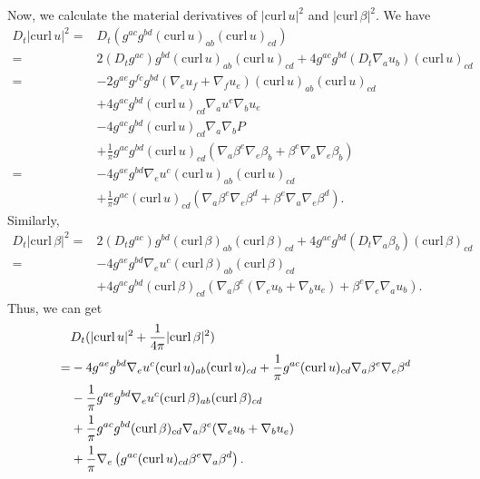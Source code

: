 \documentclass[12pt,reqno]{amsart}
\numberwithin{equation}{section}
\theoremstyle{definition}
\theoremstyle{remark}
\begin{document}
Now, we calculate the material derivatives of $|{\mathrm{curl}\,} u|^2$ and $|{\mathrm{curl}\,} \beta|^2$. We have
\begin{align*}
    D_t|{\mathrm{curl}\,} u|^2=&D_t\left(g^{ac}g^{bd}({\mathrm{curl}\,} u)_{ab}({\mathrm{curl}\,} u)_{cd}\right)\\
    =&2(D_t g^{ac})g^{bd}({\mathrm{curl}\,} u)_{ab}({\mathrm{curl}\,} u)_{cd}+4 g^{ac}g^{bd}(D_t{\nabla}_a u_b)({\mathrm{curl}\,} u)_{cd}\\
    =&-2g^{ae}g^{fc}g^{bd}({\nabla}_eu_f+{\nabla}_f u_e)({\mathrm{curl}\,} u)_{ab}({\mathrm{curl}\,} u)_{cd}\\
    &+4 g^{ac}g^{bd}({\mathrm{curl}\,} u)_{cd}{\nabla}_a u^e{\nabla}_bu_e\\
    &-4 g^{ac}g^{bd}({\mathrm{curl}\,} u)_{cd} {\nabla}_a{\nabla}_b{P } \\
    &+\frac{1}{\pi}g^{ac}g^{bd}({\mathrm{curl}\,} u)_{cd}({\nabla}_a\beta^e {\nabla}_e\beta_b+\beta^e{\nabla}_a{\nabla}_e\beta_b)\\
    =&-4g^{ae}g^{bd}{\nabla}_eu^c({\mathrm{curl}\,} u)_{ab}({\mathrm{curl}\,} u)_{cd}\\
    &+\frac{1}{\pi}g^{ac}({\mathrm{curl}\,} u)_{cd}({\nabla}_a\beta^e {\nabla}_e\beta^d+\beta^e{\nabla}_a{\nabla}_e\beta^d).
\end{align*}
Similarly,
\begin{align*}
    D_t|{\mathrm{curl}\,} \beta|^2=&2(D_t g^{ac})g^{bd}({\mathrm{curl}\,} \beta)_{ab}({\mathrm{curl}\,} \beta)_{cd}+4 g^{ac}g^{bd}(D_t{\nabla}_a \beta_b)({\mathrm{curl}\,} \beta)_{cd}\\
    =&-4g^{ae}g^{bd}{\nabla}_eu^c({\mathrm{curl}\,} \beta)_{ab}({\mathrm{curl}\,} \beta)_{cd}\\
    &+4 g^{ac}g^{bd}({\mathrm{curl}\,} \beta)_{cd}({\nabla}_a\beta^e({\nabla}_e u_b+{\nabla}_b u_e)+\beta^e{\nabla}_e{\nabla}_a u_b).
\end{align*}
Thus, we can get
\begin{align}\label{eq.1energy1.curl}
  &D_t(|{\mathrm{curl}\,} u|^2+\frac{1}{4\pi}|{\mathrm{curl}\,} \beta|^2){\nonumber}\\
  =&-4g^{ae}g^{bd}{\nabla}_eu^c({\mathrm{curl}\,} u)_{ab}({\mathrm{curl}\,} u)_{cd}+\frac{1}{\pi}g^{ac}({\mathrm{curl}\,} u)_{cd}{\nabla}_a\beta^e {\nabla}_e\beta^d{\nonumber}\\
  &-\frac{1}{\pi}g^{ae}g^{bd}{\nabla}_eu^c({\mathrm{curl}\,} \beta)_{ab}({\mathrm{curl}\,} \beta)_{cd}{\nonumber}\\
  &+\frac{1}{\pi} g^{ac}g^{bd}({\mathrm{curl}\,} \beta)_{cd}{\nabla}_a\beta^e({\nabla}_e u_b+{\nabla}_b u_e){\nonumber}\\
  &+\frac{1}{\pi}{\nabla}_e\left(g^{ac}({\mathrm{curl}\,} u)_{cd}\beta^e{\nabla}_a\beta^d\right).
\end{align}
\end{document}
